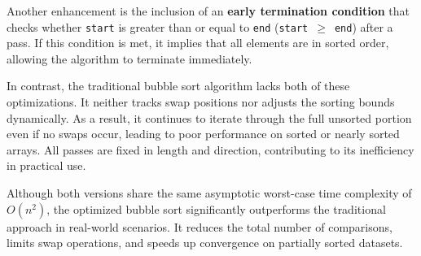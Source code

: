 
Another enhancement is the inclusion of an \textbf{early termination condition} that checks whether \texttt{start} is greater than or equal to \texttt{end} (\texttt{start}~$\geq$~\texttt{end}) after a pass. If this condition is met, it implies that all elements are in sorted order, allowing the algorithm to terminate immediately. 

In contrast, the traditional bubble sort algorithm lacks both of these optimizations. It neither tracks swap positions nor adjusts the sorting bounds dynamically. As a result, it continues to iterate through the full unsorted portion even if no swaps occur, leading to poor performance on sorted or nearly sorted arrays. All passes are fixed in length and direction, contributing to its inefficiency in practical use.

Although both versions share the same asymptotic worst-case time complexity of \(O(n^2)\), the optimized bubble sort significantly outperforms the traditional approach in real-world scenarios. It reduces the total number of comparisons, limits swap operations, and speeds up convergence on partially sorted datasets.

